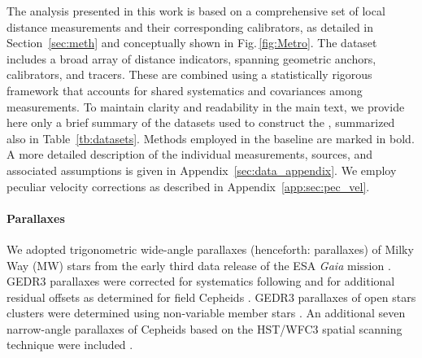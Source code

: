 The analysis presented in this work is based on a comprehensive set of local distance measurements and their corresponding calibrators, as detailed in Section~\ref{sec:meth} and conceptually shown in Fig.\,\ref{fig:Metro}. The dataset includes a broad array of distance indicators, spanning geometric anchors, calibrators, and tracers. These are combined using a statistically rigorous framework that accounts for shared systematics and covariances among measurements.
To maintain clarity and readability in the main text, we provide here only a brief summary of the datasets used to construct the \DN, summarized also in Table~\ref{tb:datasets}. Methods employed in the baseline are marked in bold. A more detailed description of the individual measurements, sources, and associated assumptions is given in Appendix~\ref{sec:data_appendix}. We employ peculiar velocity corrections as described in Appendix~\ref{app:sec:pec_vel}.



\paragraph{\textbf{Parallaxes}}
We adopted trigonometric wide-angle parallaxes (henceforth: parallaxes) of Milky Way (MW) stars from the early third data release of the ESA {\it Gaia} mission \citep[GEDR3;][]{2016A&A...595A...1G,2021A&A...649A...1G}. GEDR3 parallaxes were corrected for systematics following \citet{2021A&A...649A...4L} and for additional residual offsets as determined for field Cepheids \citep{2021ApJ...908L...6R}. GEDR3 parallaxes of open stars clusters were determined using non-variable member stars \citep{2022ApJ...938...36R,2023A&A...672A..85C}. An additional seven narrow-angle parallaxes of Cepheids based on the HST/WFC3 spatial scanning technique were included \citep{2018ApJ...855..136R}. 

